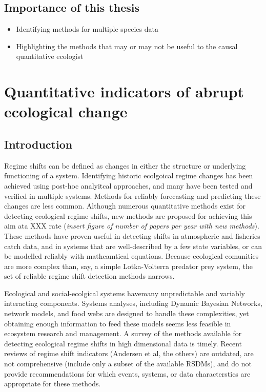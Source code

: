 \documentclass[12pt,twoside]{reedthesis}
\providecommand{\tightlist}{%
  \setlength{\itemsep}{0pt}\setlength{\parskip}{0pt}}
\begin{document}
\section{Importance of this thesis}\label{importance-of-this-thesis}
\begin{itemize}
\tightlist
\item
  Identifying methods for multiple species data
\item
  Highlighting the methods that may or may not be useful to the causal
  quantitative ecologist
\end{itemize}
\chapter{Quantitative indicators of abrupt ecological
change}\label{indicators-chapter}

\section{Introduction}\label{introduction}

Regime shifts can be defined as changes in either the structure or
underlying functioning of a system. Identifying historic ecolgoical
regime changes has been achieved using post-hoc analyitcal approaches,
and many have been tested and verified in multiple systems. Methods for
reliably forecasting and predicting these changes are less common.
Although numerous quantitative methods exist for detecting ecological
regime shifts, new methods are proposed for achieving this aim ata XXX
rate (\emph{insert figure of number of papers per year with new
methods}). These methods have proven useful in detecting shifts in
atmospheric and fisheries catch data, and in systems that are
well-described by a few state variables, or can be modelled reliably
with matheamtical equations. Because ecological comunities are more
complex than, say, a simple Lotka-Volterra predator prey system, the set
of reliable regime shift detection methods narrows.

Ecological and social-ecolgical systems havemany unpredictable and
variably interacting components. Systems analyses, including Dynamic
Bayesian Networks, network models, and food webs are designed to handle
these complexities, yet obtaining enough information to feed these
models seems less feasible in ecosystem research and management. A
survey of the methods available for detecting ecological regime shifts
in high dimensional data is timely. Recent reviews of regime shift
indicators (Andersen et al, the others) are outdated, are not
comprehensive (include only a subset of the available RSDMs), and do not
provide recommendations for which events, systems, or data
characterstics are appropriate for these methods.
\end{document}
